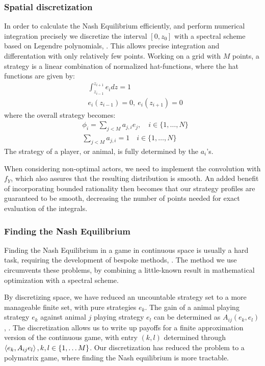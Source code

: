 \subsubsection{Spatial discretization}
In order to calculate the Nash Equilibrium efficiently, and perform numerical integration precisely we discretize the interval $[0,z_0]$ with a spectral scheme based on Legendre polynomials, \citep{kopriva2009implementing}. This allows precise integration and differentation with only relatively few points. Working on a grid with $M$ points, a strategy is a linear combination of normalized hat-functions, where the hat functions are given by:
\begin{align*}
	& \int_{z_{i-1}}^{z_{i+1}} e_i dz = 1 \\
	&e_i(z_{i-1}) = 0,~ e_i(z_{i+1}) = 0
\end{align*}
where the overall strategy becomes:
\begin{align*}
  &\phi_{i} = \sum_{j<M} a_{j,i} e_j, \quad i\in \{1,\dots, N\} \\
  &\sum_{j<M} a_{j,i} = 1 \quad i\in \{1,\dots, N\}
\end{align*}
The strategy of a player, or animal, is fully determined by the $a_i$'s.


When considering non-optimal actors, we need to implement the convolution with $f_Y$, which also assures that the resulting distribution is smooth. An added benefit of incorporating bounded rationality then becomes that our strategy profiles are guaranteed to be smooth, decreasing the number of points needed for exact evaluation of the integrals.


\subsubsection{Finding the Nash Equilibrium}
Finding the Nash Equilibrium in a game in continuous space is usually a hard task, requiring the development of bespoke methods, \citep{verticalmigration, jerome}. The method we use circumvents these problems, by combining a little-known result in mathematical optimization   with a spectral scheme.

By discretizing space, we have reduced an uncountable strategy set to a more manageable finite set, with pure strategies $e_k$. The gain of a animal playing strategy $e_k$ against animal $j$ playing strategy $e_l$ can be determined as $A_{ij}(e_k,e_l)$, . The discretization allows us to write up payoffs for a finite approximation version of the continuous game,  with entry $(k,l)$ determined through $\left \langle e_k,A_{ij}e_l \right \rangle, k,l \in \{1,\dots M\}$.
Our discretization has reduced the problem to a polymatrix game, where finding the Nash equilibrium is more tractable.

